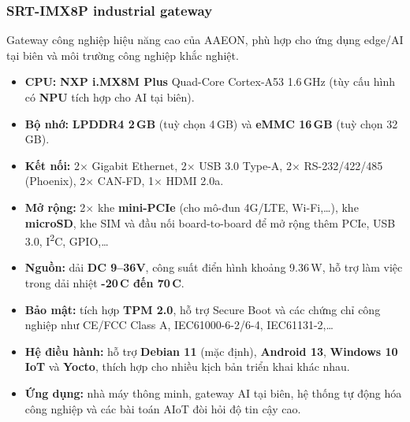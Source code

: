             \subsubsection*{SRT-IMX8P industrial gateway}
                Gateway công nghiệp hiệu năng cao của AAEON, phù hợp cho ứng dụng edge/AI tại biên và môi trường công nghiệp khắc nghiệt.
                \begin{itemize}
                    \item \textbf{CPU:} \textbf{NXP i.MX8M Plus} Quad-Core Cortex-A53 1{.}6\,GHz (tùy cấu hình có \textbf{NPU} tích hợp cho AI tại biên).
                    \item \textbf{Bộ nhớ:} \textbf{LPDDR4 2\,GB} (tuỳ chọn 4\,GB) và \textbf{eMMC 16\,GB} (tuỳ chọn 32\,GB).
                    \item \textbf{Kết nối:} 2$\times$ Gigabit Ethernet, 2$\times$ USB 3.0 Type-A, 2$\times$ RS-232/422/485 (Phoenix), 2$\times$ CAN-FD, 1$\times$ HDMI 2.0a.
                    \item \textbf{Mở rộng:} 2$\times$ khe \textbf{mini-PCIe} (cho mô-đun 4G/LTE, Wi-Fi,\dots), khe \textbf{microSD}, khe SIM và đầu nối board-to-board để mở rộng thêm PCIe, USB 3{.}0, I\textsuperscript{2}C, GPIO,\dots
                    \item \textbf{Nguồn:} dải \textbf{DC 9--36V}, công suất điển hình khoảng 9{.}36\,W, hỗ trợ làm việc trong dải nhiệt \textbf{-20\,\textdegree C đến 70\,\textdegree C}.
                    \item \textbf{Bảo mật:} tích hợp \textbf{TPM 2{.}0}, hỗ trợ Secure Boot và các chứng chỉ công nghiệp như CE/FCC Class A, IEC61000-6-2/6-4, IEC61131-2,\dots
                    \item \textbf{Hệ điều hành:} hỗ trợ \textbf{Debian 11} (mặc định), \textbf{Android 13}, \textbf{Windows 10 IoT} và \textbf{Yocto}, thích hợp cho nhiều kịch bản triển khai khác nhau.
                    \item \textbf{Ứng dụng:} nhà máy thông minh, gateway AI tại biên, hệ thống tự động hóa công nghiệp và các bài toán AIoT đòi hỏi độ tin cậy cao.
                \end{itemize}
